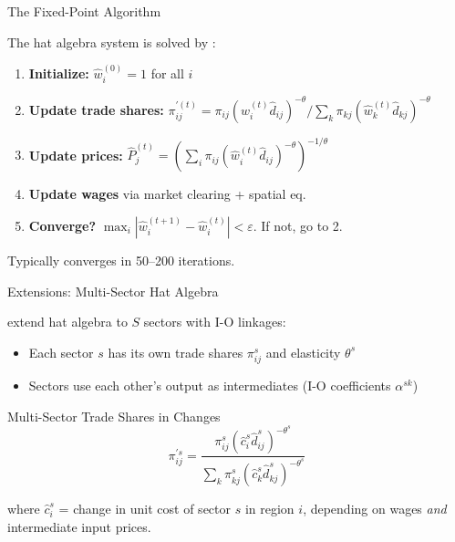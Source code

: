 \documentclass{beamer}
\begin{document}
\begin{frame}{The Fixed-Point Algorithm}

    The hat algebra system is solved by :

    \vspace{0.2em}
    {\small
    \begin{enumerate}
        \item \textbf{Initialize:} $\hat{w}_i^{(0)} = 1$ for all $i$
        \item \textbf{Update trade shares:}
            $\pi_{ij}^{\prime(t)} = \pi_{ij} (\hat{w}_i^{(t)} \hat{d}_{ij})^{-\theta} / \sum_k \pi_{kj} (\hat{w}_k^{(t)} \hat{d}_{kj})^{-\theta}$
        \item \textbf{Update prices:}
            $\hat{P}_j^{(t)} = \left(\sum_i \pi_{ij} (\hat{w}_i^{(t)} \hat{d}_{ij})^{-\theta}\right)^{-1/\theta}$
        \item \textbf{Update wages} via market clearing + spatial eq.
        \item \textbf{Converge?} $\max_i |\hat{w}_i^{(t+1)} - \hat{w}_i^{(t)}| < \varepsilon$. If not, go to 2.
    \end{enumerate}
    }

    \vspace{0.2em}
    Typically converges in 50--200 iterations. \quad {}

\end{frame}

\begin{frame}{Extensions: Multi-Sector Hat Algebra}

    \cite{CaliendoParro2015_trade} extend hat algebra to $S$ sectors with I-O linkages:

    \vspace{0.2em}
    \begin{itemize}
        \item Each sector $s$ has its own trade shares $\pi_{ij}^s$ and elasticity $\theta^s$
        \item Sectors use each other's output as intermediates (I-O coefficients $\alpha^{sk}$)
    \end{itemize}

    \vspace{0.3em}
    \begin{block}{Multi-Sector Trade Shares in Changes}
        \vspace{-0.5em}
        \[ \pi_{ij}^{\prime s} = \frac{\pi_{ij}^s (\hat{c}_i^s \hat{d}_{ij}^s)^{-\theta^s}}{\sum_k \pi_{kj}^s (\hat{c}_k^s \hat{d}_{kj}^s)^{-\theta^s}} \]
    \end{block}

    \vspace{0.2em}
    where $\hat{c}_i^s$ = change in unit cost of sector $s$ in region $i$, depending on wages \emph{and} intermediate input prices.

    \vspace{0.2em}

\end{frame}
\end{document}
